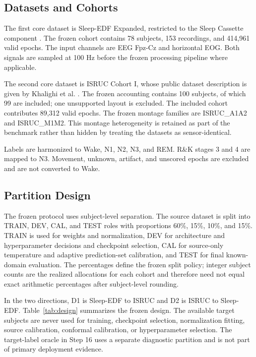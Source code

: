 \documentclass[11pt]{article}
\begin{document}
\subsection{Datasets and Cohorts}
The first core dataset is Sleep-EDF Expanded, restricted to the Sleep Cassette component \citep{imtiaz2015sleepedf}. The frozen cohort contains 78 subjects, 153 recordings, and 414,961 valid epochs. The input channels are EEG Fpz-Cz and horizontal EOG. Both signals are sampled at 100 Hz before the frozen processing pipeline where applicable.

The second core dataset is ISRUC Cohort I, whose public dataset description is given by Khalighi et al. \citep{khalighi2016isruc}. The frozen accounting contains 100 subjects, of which 99 are included; one unsupported layout is excluded. The included cohort contributes 89,312 valid epochs. The frozen montage families are ISRUC\_A1A2 and ISRUC\_M1M2. This montage heterogeneity is retained as part of the benchmark rather than hidden by treating the datasets as sensor-identical.

Labels are harmonized to Wake, N1, N2, N3, and REM. R\&K stages 3 and 4 are mapped to N3. Movement, unknown, artifact, and unscored epochs are excluded and are not converted to Wake.

\subsection{Partition Design}
The frozen protocol uses subject-level separation. The source dataset is split into TRAIN, DEV, CAL, and TEST roles with proportions 60\%, 15\%, 10\%, and 15\%. TRAIN is used for weights and normalization, DEV for architecture and hyperparameter decisions and checkpoint selection, CAL for source-only temperature and adaptive prediction-set calibration, and TEST for final known-domain evaluation. The percentages define the frozen split policy; integer subject counts are the realized allocations for each cohort and therefore need not equal exact arithmetic percentages after subject-level rounding.

In the two directions, D1 is Sleep-EDF to ISRUC and D2 is ISRUC to Sleep-EDF. Table~\ref{tab:design} summarizes the frozen design. The available target subjects are never used for training, checkpoint selection, normalization fitting, source calibration, conformal calibration, or hyperparameter selection. The target-label oracle in Step 16 uses a separate diagnostic partition and is not part of primary deployment evidence.
\end{document}
